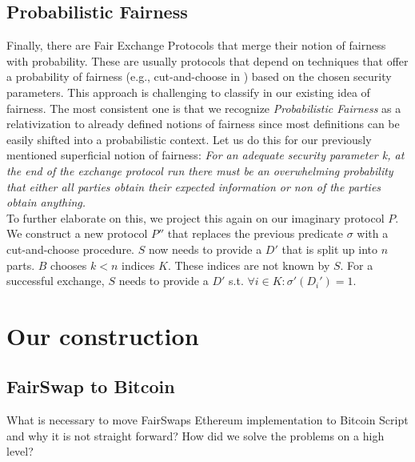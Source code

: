 \documentclass{cacthesis}
\newcounter{protocol}
\begin{document}
        \section{Probabilistic Fairness}
        Finally, there are Fair Exchange Protocols that merge their notion of fairness with probability. These are usually protocols that depend on techniques that offer a probability of fairness (e.g., cut-and-choose in \cite{DELGADOSEGURA2020832}) based on the chosen security parameters. This approach is challenging to classify in our existing idea of fairness. The most consistent one is that we recognize \textit{Probabilistic Fairness} as a relativization to already defined notions of fairness since most definitions can be easily shifted into a probabilistic context. Let us do this for our previously mentioned superficial notion of fairness: \textit{For an adequate security parameter k, at the end of the exchange protocol run there must be an overwhelming probability that either all parties obtain their expected information or non of the parties obtain anything.} \\
        To further elaborate on this, we project this again on our imaginary protocol $P$. We construct a new protocol $P''$ that replaces the previous predicate $\sigma$ with a cut-and-choose procedure. $S$ now needs to provide a $D'$ that is split up into $n$ parts. $B$ chooses $k < n$ indices $K$. These indices are not known by $S$. For a successful exchange, $S$ needs to provide a $D'$ s.t. $\forall i\in K:\sigma'\left( D_{i}'\right) =1$. \\

        
		
	\chapter{Our construction}
	   
	   \newpage
	   \section{FairSwap to Bitcoin}
        What is necessary to move FairSwaps Ethereum implementation to Bitcoin Script and why it is not straight forward? How did we solve the problems on a high level? 
        
\end{document}
